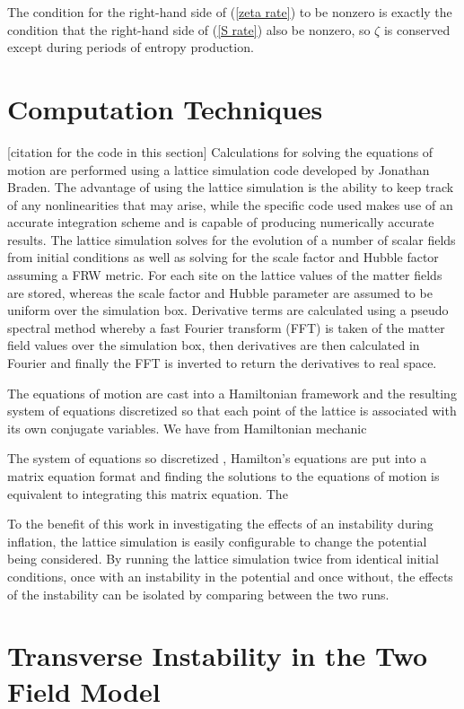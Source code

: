 \documentclass[letterpaper,11pt]{article}
\begin{document}
The condition for the right-hand side of (\ref{zeta rate}) to be nonzero is exactly the condition that the right-hand side of (\ref{S rate}) also be nonzero, so $\zeta$ is conserved except during periods of entropy production.

\section{Computation Techniques}
[citation for the code in this section]
Calculations for solving the equations of motion are performed using a lattice simulation code developed by Jonathan Braden.%
The advantage of using the lattice simulation is the ability to keep track of any nonlinearities that may arise, while the specific code used makes use of an accurate integration scheme and is capable of producing numerically accurate results. %
The lattice simulation solves for the evolution of a number of scalar fields from initial conditions as well as solving for the scale factor and Hubble factor assuming a FRW metric. For each site on the lattice values of the matter fields are stored, whereas the scale factor and Hubble parameter are assumed to be uniform over the simulation box. Derivative terms are calculated using a pseudo spectral method whereby a fast Fourier transform (FFT) is taken of the matter field values over the simulation box, then derivatives are then calculated in Fourier and finally the FFT is inverted to return the derivatives to real space.

The equations of motion are cast into a Hamiltonian framework and the resulting system of equations discretized so that each point of the lattice is associated with its own conjugate variables. We have from Hamiltonian mechanic

The system of equations so discretized , Hamilton's equations are put into a matrix equation format and finding the solutions to the equations of motion is equivalent to integrating this matrix equation. The 

To the benefit of this work in investigating the effects of an instability during inflation, the lattice simulation is easily configurable to change the potential being considered. By running the lattice simulation twice from identical initial conditions, once with an instability in the potential and once without, the effects of the instability can be isolated by comparing between the two runs.

\section{Transverse Instability in the Two Field Model}
\end{document}
